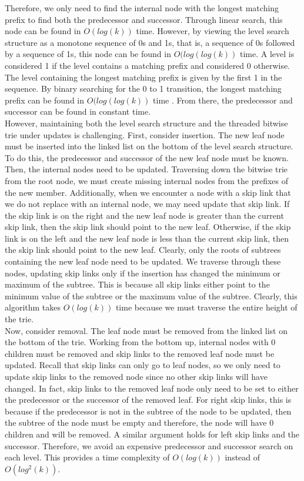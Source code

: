 \documentclass{article}
\begin{document}
\noindent
Therefore, we only need to find the internal node with the longest matching prefix to find both the predecessor and successor. Through linear search, this node can be found in $O(log(k))$ time. However, by viewing the level search structure as a monotone sequence of 0s and 1s, that is, a sequence of 0s followed by a sequence of 1s, this node can be found in $O(log(log(k))$ time. A level is considered 1 if the level contains a matching prefix and considered 0 otherwise. The level containing the longest matching prefix is given by the first 1 in the sequence. By binary searching for the 0 to 1 transition, the longest matching prefix can be found in $O(log(log(k))$ time \cite{WILLARD198381}. From there, the predecessor and successor can be found in constant time.
\\

\noindent
However, maintaining both the level search structure and the threaded bitwise trie under updates is challenging. First, consider insertion. The new leaf node must be inserted into the linked list on the bottom of the level search structure. To do this, the predecessor and successor of the new leaf node must be known. Then, the internal nodes need to be updated. Traversing down the bitwise trie from the root node, we must create missing internal nodes from the prefixes of the new member. Additionally, when we encounter a node with a skip link that we do not replace with an internal node, we may need update that skip link. If the skip link is on the right and the new leaf node is greater than the current skip link, then the skip link should point to the new leaf. Otherwise, if the skip link is on the left and the new leaf node is less than the current skip link, then the skip link should point to the new leaf. Clearly, only the roots of subtrees containing the new leaf node need to be updated. We traverse through these nodes, updating skip links only if the insertion has changed the minimum or maximum of the subtree. This is because all skip links either point to the minimum value of the subtree or the maximum value of the subtree. Clearly, this algorithm takes $O(log(k))$ time because we must traverse the entire height of the trie.
\\

\noindent
Now, consider removal. The leaf node must be removed from the linked list on the bottom of the trie. Working from the bottom up, internal nodes with 0 children must be removed and skip links to the removed leaf node must be updated. Recall that skip links can only go to leaf nodes, so we only need to update skip links to the removed node since no other skip links will have changed. In fact, skip links to the removed leaf node only need to be set to either the predecessor or the successor of the removed leaf. For right skip links, this is because if the predecessor is not in the subtree of the node to be updated, then the subtree of the node must be empty and therefore, the node will have 0 children and will be removed. A similar argument holds for left skip links and the successor. Therefore, we avoid an expensive predecessor and successor search on each level. This provides a time complexity of $O(log(k))$ instead of $O(log^2(k))$.
\\
\end{document}
